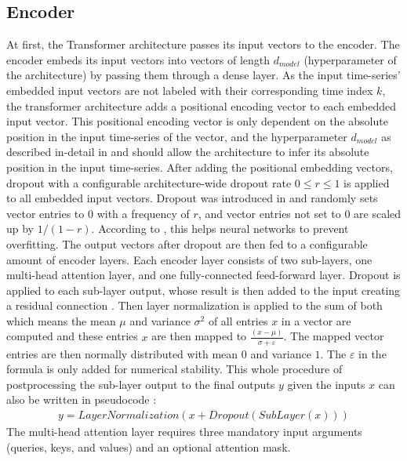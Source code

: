 \documentclass[draft,final]{vutinfth} %
\begin{document}
    \subsection{Encoder} \label{encoder}
    At first, the Transformer architecture passes its input vectors to the encoder.
    The encoder embeds its input vectors into vectors of length $d_{model}$ (hyperparameter of the architecture) by passing them through a dense layer.
    As the input time-series' embedded input vectors are not labeled with their corresponding time index $k$, the transformer architecture adds a positional encoding vector to each embedded input vector.
    This positional encoding vector is only dependent on the absolute position in the input time-series of the vector, and the hyperparameter $d_{model}$ as described in-detail in \cite[p. 6]{Transformer} and should allow the architecture to infer its absolute position in the input time-series.
    After adding the positional embedding vectors, dropout with a configurable architecture-wide dropout rate $0 \leq r \leq 1$ is applied to all embedded input vectors.
    Dropout was introduced in \cite{dropout} and randomly sets vector entries to $0$ with a frequency of $r$, and vector entries not set to $0$ are scaled up by $1/(1-r)$.
    According to \cite[p. 1]{dropout}, this helps neural networks to prevent overfitting.
    The output vectors after dropout are then fed to a configurable amount of encoder layers.
    Each encoder layer consists of two sub-layers, one multi-head attention layer, and one fully-connected feed-forward layer.
    Dropout is applied to each sub-layer output, whose result is then added to the input creating a residual connection \cite{ResNet}.
    Then layer normalization \cite{layer_norm} is applied to the sum of both which means the mean $\mu$ and variance $\sigma^2$ of all entries $x$ in a vector are computed and these entries $x$ are then mapped to $\frac{(x-\mu)}{\sigma + \varepsilon}$.
    The mapped vector entries are then normally distributed with mean $0$ and variance $1$. The $\varepsilon$ in the formula is only added for numerical stability.
    This whole procedure of postprocessing the sub-layer output to the final outputs $y$ given the inputs $x$ can also be written in pseudocode \cite[p. 3]{Transformer}:
    \begin{align}
        y = LayerNormalization(x + Dropout(SubLayer(x)))
    \end{align}
    The multi-head attention layer requires three mandatory input arguments (queries, keys, and values) and an optional attention mask.
\end{document}

